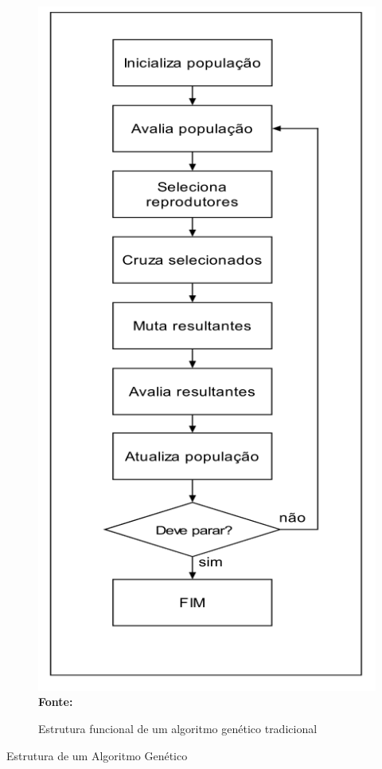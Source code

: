 \begin{figure}[!htb]
\caption[Estrutura funcional de um algoritmo genético tradicional]{Estrutura funcional de um algoritmo genético tradicional}
\label{fig:ag}
\centering
\includegraphics[scale=0.62]{imagens/ag.png}
\\ \textbf{\footnotesize Fonte: \cite{lucas2000algoritmos}}
\end{figure}

 Estrutura de um Algoritmo Genético 
 
